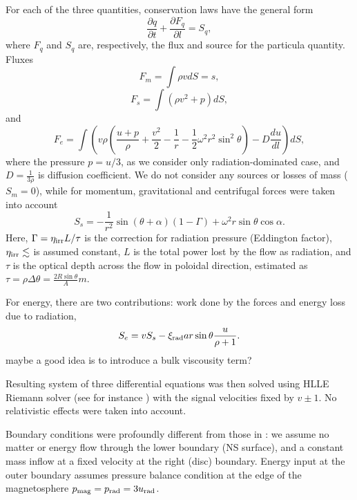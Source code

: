\documentclass[usenatbib]{mnras}
\newcommand{\pardir}[2]{\ensuremath{\frac{\partial #2}{\partial #1} }}
\newcommand{\alert}[1]{\color{red}#1\color{black}}
\begin{document}
For each of the three quantities, conservation laws have the general form
\begin{equation}\label{E:timedep:qcons}
  \pardir{t}{q} + \pardir{l}{F_q} = S_q,
\end{equation}
where $F_q$ and $S_q$ are, respectively, the flux and source for the particula
quantity. Fluxes
\begin{equation}\label{E:timedep:fluxm}
F_m =  \int \rho v dS = s,
\end{equation}
\begin{equation}\label{E:timedep:fluxs}
F_s =  \int \left(\rho v^2 + p\right) dS,
\end{equation}
and
\begin{equation}\label{E:timedep:fluxe}
F_e =  \int \left( v \rho \left(\frac{u + p}{\rho} + \frac{v^2}{2} -\frac{1}{r} -
\frac{1}{2} \omega^2 r^2\sin^2\theta \right) - D \frac{du}{dl}\right) dS,
\end{equation}
where the pressure $p=u/3$, as we consider only radiation-dominated case, and
$D = \frac{1}{3\rho}$ is diffusion coefficient. We do not consider any sources
or losses of mass ($S_m=0$), while for momentum, gravitational and centrifugal forces
were taken into account
\begin{equation}\label{E:timedep:srcs}
S_s = - \frac{1}{r^2}\sin(\theta+\alpha) \left( 1-\Gamma\right) + \omega^2r \sin\theta \cos\alpha.
\end{equation}
Here, $\Gamma=\eta_{\rm irr} L / \tau$ is the correction for radiation pressure
(Eddington factor), $\eta_{\rm irr}\lesssim $ is assumed constant, $L$ is the
total power lost by the flow as radiation, and $\tau$ is the optical depth
across the flow in poloidal direction, estimated as $\tau = \rho \Delta \theta
= \frac{2R\sin\theta}{A} m $.

For energy, there are two contributions: work done by the forces and energy
loss due to radiation,
\begin{equation}\label{E:timedep:srce}
  S_e = v S_s - \xi_{\rm rad} a r \sin\theta \frac{u}{\rho+1}.
\end{equation}
\alert{maybe a good idea is to introduce a bulk viscousity term?\\}

Resulting system of three differential equations was then solved using HLLE
Riemann solver (see for instance \citealt{einfeldt}) with the signal
velocities fixed by $v\pm 1$. No relativistic effects were taken into
account. 

Boundary conditions were profoundly different from those in \citet{basko-sunyaev1976}: we
assume no matter or energy flow through the lower boundary (NS surface), and a constant
mass inflow at a fixed velocity at the right (disc) boundary. Energy input at
the outer boundary assumes pressure balance condition at the edge of the
magnetosphere $p_{\rm mag} = p_{\rm rad} = 3u_{\rm rad}$.




\label{lastpage}
\end{document}
